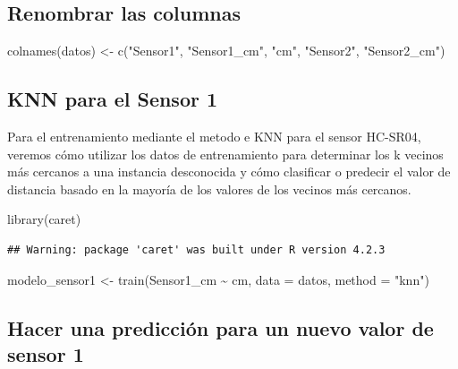 \documentclass[
]{article}
\newenvironment{Shaded}{\begin{snugshade}}{\end{snugshade}}
\newcommand{\AttributeTok}[1]{\textcolor[rgb]{0.77,0.63,0.00}{#1}}
\newcommand{\FunctionTok}[1]{\textcolor[rgb]{0.00,0.00,0.00}{#1}}
\newcommand{\NormalTok}[1]{#1}
\newcommand{\OtherTok}[1]{\textcolor[rgb]{0.56,0.35,0.01}{#1}}
\newcommand{\SpecialCharTok}[1]{\textcolor[rgb]{0.00,0.00,0.00}{#1}}
\newcommand{\StringTok}[1]{\textcolor[rgb]{0.31,0.60,0.02}{#1}}
\begin{document}
\hypertarget{renombrar-las-columnas}{%
\subsection{Renombrar las columnas}\label{renombrar-las-columnas}}

\begin{Shaded}
\begin{Highlighting}[]
\FunctionTok{colnames}\NormalTok{(datos) }\OtherTok{\textless{}{-}} \FunctionTok{c}\NormalTok{(}\StringTok{"Sensor1"}\NormalTok{, }\StringTok{"Sensor1\_cm"}\NormalTok{, }\StringTok{"cm"}\NormalTok{, }\StringTok{"Sensor2"}\NormalTok{, }\StringTok{"Sensor2\_cm"}\NormalTok{)}
\end{Highlighting}
\end{Shaded}

\hypertarget{knn-para-el-sensor-1}{%
\subsection{KNN para el Sensor 1}\label{knn-para-el-sensor-1}}

Para el entrenamiento mediante el metodo e KNN para el sensor HC-SR04,
veremos cómo utilizar los datos de entrenamiento para determinar los k
vecinos más cercanos a una instancia desconocida y cómo clasificar o
predecir el valor de distancia basado en la mayoría de los valores de
los vecinos más cercanos.

\begin{Shaded}
\begin{Highlighting}[]
\FunctionTok{library}\NormalTok{(caret)}
\end{Highlighting}
\end{Shaded}

\begin{verbatim}
## Warning: package 'caret' was built under R version 4.2.3
\end{verbatim}

\begin{Shaded}
\begin{Highlighting}[]
\NormalTok{modelo\_sensor1 }\OtherTok{\textless{}{-}} \FunctionTok{train}\NormalTok{(Sensor1\_cm }\SpecialCharTok{\textasciitilde{}}\NormalTok{ cm, }\AttributeTok{data =}\NormalTok{ datos, }\AttributeTok{method =} \StringTok{"knn"}\NormalTok{)}
\end{Highlighting}
\end{Shaded}

\hypertarget{hacer-una-predicciuxf3n-para-un-nuevo-valor-de-sensor-1}{%
\subsection{Hacer una predicción para un nuevo valor de sensor
1}\label{hacer-una-predicciuxf3n-para-un-nuevo-valor-de-sensor-1}}
\end{document}

